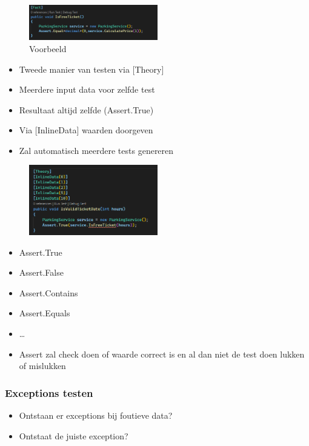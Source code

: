 \documentclass{article}
\begin{document}
\begin{figure}[H]
    \centering
    \includegraphics[width=0.5\textwidth]{unit-test1.png}
    \caption{Voorbeeld}
\end{figure}

\begin{itemize}
    \item Tweede manier van testen via {[Theory]}
    \item Meerdere input data voor zelfde test
    \item Resultaat altijd zelfde (Assert.True)
    \item Via {[InlineData]} waarden doorgeven
    \item Zal automatisch meerdere tests genereren
\end{itemize}

\begin{figure}[H]
    \centering
    \includegraphics[width=0.5\textwidth]{unit-test2.png}
    \caption{}
\end{figure}

\begin{itemize}
    \item Assert.True
    \item Assert.False
    \item Assert.Contains
    \item Assert.Equals
    \item \dots
    \item Assert zal check doen of waarde correct is en al dan niet de test doen lukken of mislukken
\end{itemize}

\subsubsection{Exceptions testen}

\begin{itemize}
    \item Ontstaan er exceptions bij foutieve data?
    \item Ontstaat de juiste exception?
\end{itemize}
\end{document}
